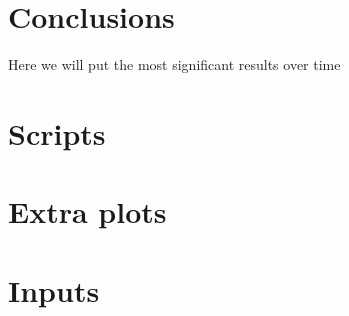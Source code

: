 \documentclass[11pt,letterpaper]{report}
\begin{document}
	
	
	
	
	\chapter{Conclusions}
	Here we will put the most significant results over time
	
	
	
	
	\appendix
	
	\chapter[Scripts]{Scripts}
	
	\chapter{Extra plots}
	
	\chapter{Inputs}
	
	
	
	
	
	
	
\end{document}
